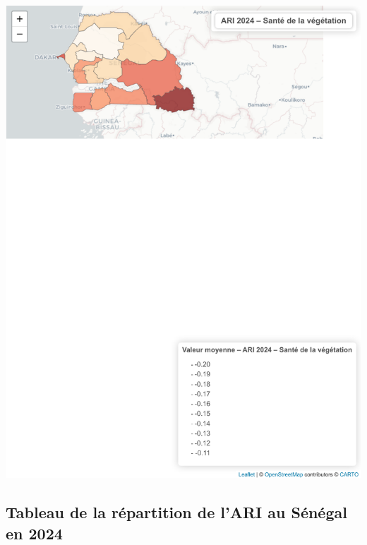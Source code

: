 \documentclass[
]{book}
\begin{document}
\includegraphics{Atlas-Spectral-Sahel_files/figure-latex/vegetation-ari-1.pdf}

\subsection{Tableau de la répartition de l'ARI au Sénégal en 2024}\label{tableau-de-la-ruxe9partition-de-lari-au-suxe9nuxe9gal-en-2024}
\end{document}
